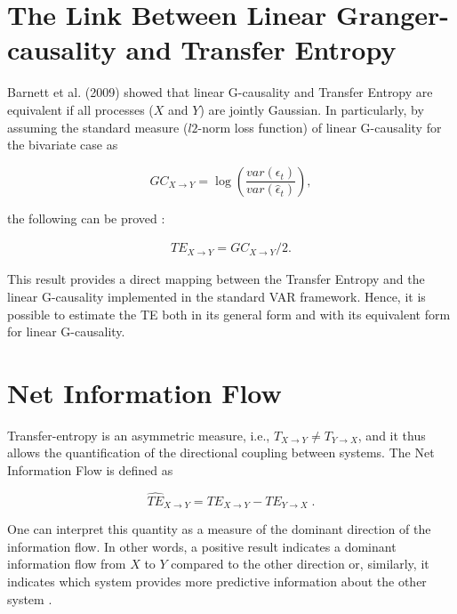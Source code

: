 \documentclass[]{book}
\theoremstyle{definition}
\theoremstyle{definition}
\theoremstyle{definition}
\theoremstyle{remark}
\begin{document}
\section{The Link Between Linear Granger-causality and Transfer
Entropy}\label{the-link-between-linear-granger-causality-and-transfer-entropy}

Barnett et al. (2009) \cite{PhysRevLett.103.238701} showed that linear
G-causality and Transfer Entropy are equivalent if all processes (\(X\)
and \(Y\)) are jointly Gaussian. In particularly, by assuming the
standard measure (\(l2\)-norm loss function) of linear G-causality for
the bivariate case as

\begin{equation}
GC_{X \rightarrow Y} = \log\left( \frac{var(\epsilon_t)}{var( \widehat{\epsilon}_t)} \right),
\label{eq:GCGC}
\end{equation}

the following can be proved \cite{PhysRevLett.103.238701}:

\begin{align}
TE_{X \rightarrow Y} = GC_{X \rightarrow Y}/2.
\label{eq:GCGC2}
\end{align}

This result provides a direct mapping between the Transfer Entropy and
the linear G-causality implemented in the standard VAR framework. Hence,
it is possible to estimate the TE both in its general form and with its
equivalent form for linear G-causality.

\section{Net Information Flow}\label{net-information-flow}

Transfer-entropy is an asymmetric measure, i.e.,
\(T_{X \rightarrow Y} \neq T_{Y \rightarrow X}\), and it thus allows the
quantification of the directional coupling between systems. The Net
Information Flow is defined as

\begin{equation}
\widehat{TE}_{X \rightarrow Y} = TE_{X \rightarrow Y} - TE_{Y \rightarrow X}\;.
\end{equation}

One can interpret this quantity as a measure of the dominant direction
of the information flow. In other words, a positive result indicates a
dominant information flow from \(X\) to \(Y\) compared to the other
direction or, similarly, it indicates which system provides more
predictive information about the other system
\cite{Michalowicz:2013:HDE:2601840}.
\end{document}
